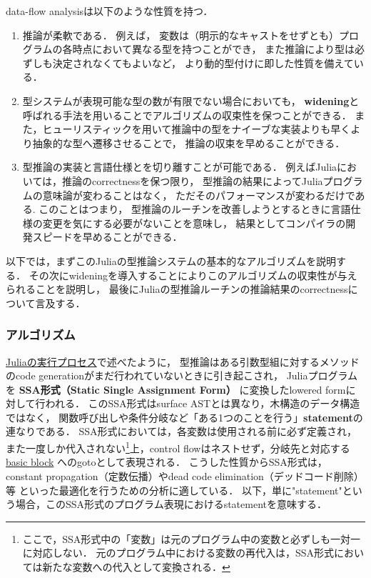 data-flow analysisは以下のような性質を持つ．

\begin{enumerate}
  \item 推論が柔軟である．
        例えば，
        変数は（明示的なキャストをせずとも）プログラムの各時点において異なる型を持つことができ，
        また推論により型は必ずしも決定されなくてもよいなど，
        より動的型付けに即した性質を備えている．
  \item 型システムが表現可能な型の数が有限でない場合においても，
        \textbf{widening}と呼ばれる手法を用いることでアルゴリズムの収束性を保つことができる．
        また，ヒューリスティックを用いて推論中の型をナイーブな実装よりも早くより抽象的な型へ遷移させることで，
        推論の収束を早めることができる．
  \item 型推論の実装と言語仕様とを切り離すことが可能である．
        例えばJuliaにおいては，推論のcorrectnessを保つ限り，
        型推論の結果によってJuliaプログラムの意味論が変わることはなく，
        ただそのパフォーマンスが変わるだけである.
        このことはつまり，
        型推論のルーチンを改善しようとするときに言語仕様の変更を気にする必要がないことを意味し，
        結果としてコンパイラの開発スピードを早めることができる．
\end{enumerate}

以下では，まずこのJuliaの型推論システムの基本的なアルゴリズムを説明する．
その次にwideningを導入することによりこのアルゴリズムの収束性が与えられることを説明し，
最後にJuliaの型推論ルーチンの推論結果のcorrectnessについて言及する．

\subsubsection{アルゴリズム} \label{subsubsection:inference-algorithm}

\hyperref[subsubsection:eval-process]{Juliaの実行プロセス}で述べたように，
型推論はある引数型組に対するメソッドのcode generationがまだ行われていないときに引き起こされ，
Juliaプログラムを
\textbf{SSA形式（Static Single Assignment Form）}\cite{julia-ssa}
に変換したlowered formに対して行われる．
このSSA形式はsurface ASTとは異なり，木構造のデータ構造ではなく，
関数呼び出しや条件分岐など「ある1つのことを行う」\textbf{statement}の連なりである．
SSA形式においては，各変数は使用される前に必ず定義され，また一度しか代入されない\footnote{
  ここで，SSA形式中の「変数」は元のプログラム中の変数と必ずしも一対一に対応しない．
  元のプログラム中における変数の再代入は，SSA形式においては新たな変数への代入として変換される．
}上，control flowはネストせず，分岐先と対応する
\href{https://en.wikipedia.org/wiki/Basic_block}{basic block}
へのgotoとして表現される．
こうした性質からSSA形式は，
constant propagation（定数伝播）やdead code elimination（デッドコード削除）等
といった最適化を行うための分析に適している．
以下，単に"statement"という場合，このSSA形式のプログラム表現におけるstatementを意味する．

